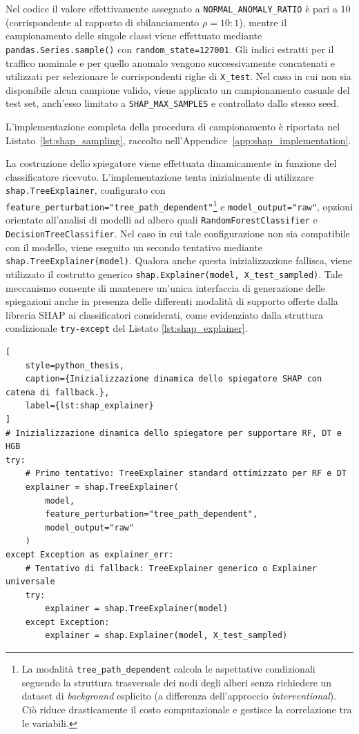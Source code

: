 Nel codice il valore effettivamente assegnato a \texttt{NORMAL\_ANOMALY\_RATIO} è pari a $10$ (corrispondente al rapporto di sbilanciamento $\rho = 10:1$), mentre il campionamento delle singole classi viene effettuato mediante \texttt{pandas.Series.sample()} con \texttt{random\_state=127001}. 
Gli indici estratti per il traffico nominale e per quello anomalo vengono successivamente concatenati e utilizzati per selezionare le corrispondenti righe di \texttt{X\_test}. 
Nel caso in cui non sia disponibile alcun campione valido, viene applicato un campionamento casuale del test set, anch'esso limitato a \texttt{SHAP\_MAX\_SAMPLES} e controllato dallo stesso seed.

L'implementazione completa della procedura di campionamento è riportata nel Listato~\ref{lst:shap_sampling}, raccolto nell'Appendice~\ref{app:shap_implementation}.

La costruzione dello spiegatore viene effettuata dinamicamente in funzione del classificatore ricevuto. 
L'implementazione tenta inizialmente di utilizzare \texttt{shap.TreeExplainer}, configurato con \texttt{feature\_perturbation="tree\_path\_dependent"}\footnote{La modalità \texttt{tree\_path\_dependent} calcola le aspettative condizionali seguendo la struttura trasversale dei nodi degli alberi senza richiedere un dataset di \textit{background} esplicito (a differenza dell'approccio \textit{interventional}). Ciò riduce drasticamente il costo computazionale e gestisce la correlazione tra le variabili.} e \texttt{model\_output="raw"}, opzioni orientate all'analisi di modelli ad albero quali \texttt{RandomForestClassifier} e \texttt{DecisionTreeClassifier}. 
Nel caso in cui tale configurazione non sia compatibile con il modello, viene eseguito un secondo tentativo mediante \texttt{shap.TreeExplainer(model)}. 
Qualora anche questa inizializzazione fallisca, viene utilizzato il costrutto generico \texttt{shap.Explainer(model, X\_test\_sampled)}.
Tale meccanismo consente di mantenere un'unica interfaccia di generazione delle spiegazioni anche in presenza delle differenti modalità di supporto offerte dalla libreria SHAP ai classificatori considerati, come evidenziato dalla struttura condizionale \texttt{try-except} del Listato \ref{lst:shap_explainer}. 

\begin{lstlisting}[
    style=python_thesis,
    caption={Inizializzazione dinamica dello spiegatore SHAP con catena di fallback.},
    label={lst:shap_explainer}
]
# Inizializzazione dinamica dello spiegatore per supportare RF, DT e HGB
try:
    # Primo tentativo: TreeExplainer standard ottimizzato per RF e DT
    explainer = shap.TreeExplainer(
        model, 
        feature_perturbation="tree_path_dependent", 
        model_output="raw"
    )
except Exception as explainer_err:
    # Tentativo di fallback: TreeExplainer generico o Explainer universale
    try:
        explainer = shap.TreeExplainer(model)
    except Exception:
        explainer = shap.Explainer(model, X_test_sampled)
\end{lstlisting}


